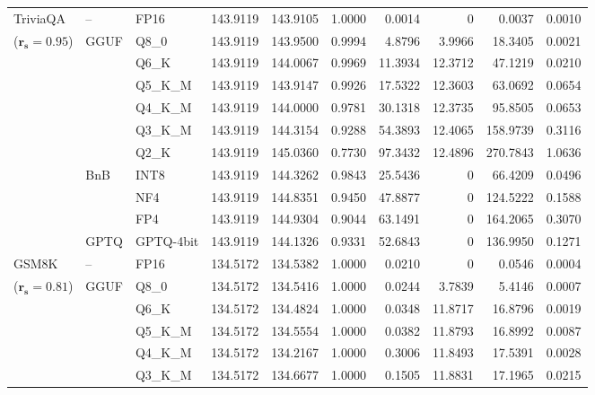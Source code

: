 \begin{table}[t]
{\begin{tabular}{ll l rrrrrrr}
\midrule
TriviaQA & -- & FP16 & 143.9119 & 143.9105 & 1.0000 & 0.0014 & \cellcolor{cyan!12} $0$ & 0.0037 & 0.0010 \\
{\small ($\mathbf{r_s{=}0.95}$)} & GGUF & Q8\_0 & 143.9119 & 143.9500 & 0.9994 & 4.8796 & 3.9966 & 18.3405 & 0.0021 \\
 &  & Q6\_K & 143.9119 & 144.0067 & 0.9969 & 11.3934 & 12.3712 & 47.1219 & 0.0210 \\
 &  & Q5\_K\_M & 143.9119 & 143.9147 & 0.9926 & 17.5322 & 12.3603 & 63.0692 & 0.0654 \\
 &  & Q4\_K\_M & 143.9119 & 144.0000 & 0.9781 & 30.1318 & 12.3735 & 95.8505 & 0.0653 \\
 &  & Q3\_K\_M & 143.9119 & 144.3154 & \cellcolor{red!18} 0.9288 & \cellcolor{red!18} 54.3893 & 12.4065 & \cellcolor{red!18} 158.9739 & \cellcolor{red!18} 0.3116 \\
 &  & Q2\_K & 143.9119 & 145.0360 & \cellcolor{red!35} 0.7730 & \cellcolor{red!35} 97.3432 & 12.4896 & \cellcolor{red!35} 270.7843 & \cellcolor{red!35} 1.0636 \\
 & BnB & INT8 & 143.9119 & 144.3262 & 0.9843 & 25.5436 & \cellcolor{cyan!12} $0$ & 66.4209 & 0.0496 \\
 &  & NF4 & 143.9119 & 144.8351 & \cellcolor{red!18} 0.9450 & \cellcolor{red!18} 47.8877 & \cellcolor{cyan!12} $0$ & \cellcolor{red!18} 124.5222 & \cellcolor{red!18} 0.1588 \\
 &  & FP4 & 143.9119 & 144.9304 & \cellcolor{red!18} 0.9044 & \cellcolor{red!18} 63.1491 & \cellcolor{cyan!12} $0$ & \cellcolor{red!18} 164.2065 & \cellcolor{red!18} 0.3070 \\
 & GPTQ & GPTQ-4bit & 143.9119 & 144.1326 & \cellcolor{red!18} 0.9331 & \cellcolor{red!18} 52.6843 & \cellcolor{cyan!12} $0$ & \cellcolor{red!18} 136.9950 & \cellcolor{red!18} 0.1271 \\
\midrule
GSM8K & -- & FP16 & 134.5172 & 134.5382 & 1.0000 & 0.0210 & \cellcolor{cyan!12} $0$ & 0.0546 & 0.0004 \\
{\small ($\mathbf{r_s{=}0.81}$)} & GGUF & Q8\_0 & 134.5172 & 134.5416 & 1.0000 & 0.0244 & 3.7839 & 5.4146 & 0.0007 \\
 &  & Q6\_K & 134.5172 & 134.4824 & 1.0000 & 0.0348 & 11.8717 & 16.8796 & 0.0019 \\
 &  & Q5\_K\_M & 134.5172 & 134.5554 & 1.0000 & 0.0382 & 11.8793 & 16.8992 & 0.0087 \\
 &  & Q4\_K\_M & 134.5172 & 134.2167 & 1.0000 & 0.3006 & 11.8493 & 17.5391 & 0.0028 \\
 &  & Q3\_K\_M & 134.5172 & 134.6677 & 1.0000 & 0.1505 & 11.8831 & 17.1965 & 0.0215 \\

\end{tabular}}
\end{table}
